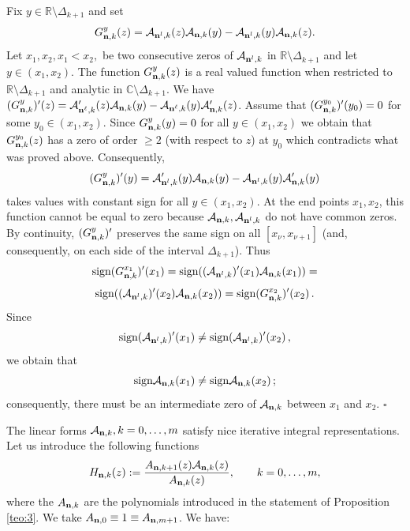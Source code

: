 \documentclass{amsart}
\theoremstyle{definition}
\theoremstyle{remark}
\begin{document}
Fix $y \in {\mathbb{R}} \setminus \Delta_{k+1}$ and set
\[ G^y_{{\bf n},k}(z) = {\mathcal{A}}_{{\bf n}^l,k}(z){\mathcal{A}}_{{\bf n},k}(y)-{\mathcal{A}}_{{\bf
n}^l,k}(y){\mathcal{A}}_{{\bf n},k}(z).
\]
Let $x_{1}, x_{2}, x_1 < x_2,$ be two consecutive zeros of ${\mathcal{A}}_{{\bf n}^l,k}$ in
${\mathbb{R}} \setminus \Delta_{k+1}$ and let $y \in
(x_1,x_2)$.
The function $G^y_{{\bf n},k}(z)$ is a real valued function when
restricted to ${\mathbb{R}} \setminus \Delta_{k+1}$ and analytic in
${\mathbb{C}} \setminus \Delta_{k+1}$. We have  $(G^y_{{\bf
n},k})^{\prime}(z) = {\mathcal{A}}_{{\bf n}^\ell,k}^{\prime}(z){\mathcal{A}}_{{\bf
n},k}(y)- {\mathcal{A}}_{{\bf n}^\ell,k}(y){\mathcal{A}}_{{\bf n},k}^{\prime}(z)$. Assume that $(G^{y_0}_{{\bf n},k})^{\prime}(y_0) = 0$ for some $y_0 \in (x_1,x_2)$. Since
$G^{y}_{{\bf n},k}(y) = 0$ for all $y \in (x_1,x_2)$
we obtain that $G^{y_0}_{{\bf n},k}(z)$ has a zero of order
$\geq 2$ (with respect to $z$) at $y_0$ which contradicts what was proved above.  Consequently,
\[(G^{y}_{{\bf n},k})^{\prime}(y) =
{\mathcal{A}}_{{\bf n}^l,k}^{\prime}(y){\mathcal{A}}_{{\bf n},k}(y)- {\mathcal{A}}_{{\bf
n}^l,k}(y){\mathcal{A}}_{{\bf n},k}^{\prime}(y)
\]
takes values with constant sign for all $y \in
(x_1,x_2)$. At the end points $x_1, x_2$,
this function cannot be equal to zero because
${\mathcal{A}}_{{\bf n},k}, {\mathcal{A}}_{{\bf n}^l,k}$ do not have common zeros.
By continuity, $(G^{y}_{{\bf n},k})^{\prime}$ preserves the same
sign on all $[x_{\nu},x_{\nu+1}]$ (and, consequently, on each side
of the interval $\Delta_{k+1}$). Thus
\[ \mbox{sign}(G^{x_1}_{{\bf n},k})^{\prime}(x_1) =
\mbox{sign}(({\mathcal{A}}_{{\bf n}^l,k})^{\prime}(x_1){\mathcal{A}}_{{\bf
n},k}(x_1)) =
\]
\[ \mbox{sign}(({\mathcal{A}}_{{\bf
n}^l,k})^{\prime}(x_2){\mathcal{A}}_{{\bf n},k}(x_2)) =
\mbox{sign}(G^{x_2}_{{\bf n},k})^{\prime}(x_2)\,.
\]
Since
\[ \mbox{sign}({\mathcal{A}}_{{\bf n}^l,k})^{\prime}(x_1) \neq \mbox{sign}({\mathcal{A}}_{{\bf
n}^l,k})^{\prime}(x_2)\,,
\]
we obtain that
\[ \mbox{sign}{\mathcal{A}}_{{\bf n},k}(x_1) \neq \mbox{sign}{\mathcal{A}}_{{\bf
n},k} (x_2)\,;
\]
consequently, there must be an intermediate zero of ${\mathcal{A}}_{{\bf
n},k}$ between $x_1$ and $x_2$.
\hfill $\square$

\medskip

The linear forms  ${\mathcal{A}}_{{\bf n},k}, k=0,\ldots,m$ satisfy nice iterative integral representations. Let us introduce the following functions
\begin{equation} \label{Hk}
H_{{\bf n},k}(z) := \frac{A_{{\bf n},k+1}(z){\mathcal{A}}_{{\bf n},k}(z)}{A_{{\bf n},k}(z)}, \qquad k=0,\ldots,m,
\end{equation}
where the $A_{{\bf n},k}$ are the polynomials introduced in the statement of Proposition \ref{teo:3}. We take $A_{{\bf n},0}\equiv 1 \equiv A_{{\bf n},m+1}$. We have:
\end{document}
